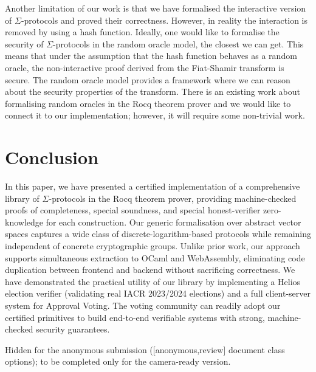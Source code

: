\documentclass[sigconf,anonymous,review]{acmart}
\begin{document}
   Another limitation of our work is 
   that we have formalised the interactive version 
   of $\Sigma$-protocols and proved their correctness. However, 
   in reality the interaction is removed by 
   using a hash function. Ideally, one would like 
   to formalise the security of $\Sigma$-protocols in the random oracle 
   model, the closest we can get. This means that under the assumption 
   that the hash function behaves as a random oracle, the non-interactive 
   proof derived from the Fiat-Shamir transform \cite{10.5555/36664.36676} is secure. 
   The random oracle model provides a framework where we can 
   reason about the security properties  of 
   the transform. There is an existing 
   work about formalising random oracles in the Rocq theorem 
   prover \cite{10.1007/11617990_3} and we would like to
   connect it to our implementation; however, it
   will require some non-trivial work.


\section{Conclusion}
   In this paper, we have presented a certified implementation of a comprehensive library of $\Sigma$-protocols in the Rocq theorem prover, providing machine-checked proofs of completeness, special soundness, and special honest-verifier zero-knowledge for each construction. Our generic formalisation over abstract vector spaces captures a wide class of discrete-logarithm-based protocols while remaining independent of concrete cryptographic groups. Unlike prior work, our approach supports simultaneous extraction to OCaml and WebAssembly, eliminating code duplication between frontend and backend without sacrificing correctness. We have demonstrated the practical utility of our library by implementing a Helios election verifier (validating real IACR 2023/2024 elections) and a full client-server system for Approval Voting. The voting community can readily adopt our certified primitives to build end-to-end verifiable systems with strong, machine-checked security guarantees.





\appendix

\begin{acks}
Hidden for the anonymous submission ([anonymous,review] document class
options); to be completed only for the camera-ready version.
\end{acks}
\end{document}
